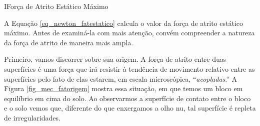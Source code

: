 













\begin{secnivel}{I}{Força de Atrito Estático Máximo}
  

\end{secnivel}








A Equação \eqref{eq_newton_fatestatico} calcula o valor da força de atrito estático máximo. Antes de examiná-la com mais atenção, convém compreender a natureza da força de atrito de maneira mais ampla.

Primeiro, vamos discorrer sobre sua origem. A força de atrito entre duas superfícies é uma força que irá resistir à tendência de movimento relativo entre as superfícies pelo fato de elas estarem, em escala microscópica, ``\textit{acopladas}.'' A Figura \ref{fig_mec_fatorigem} mostra essa situação, em que temos um bloco em equilíbrio em cima do solo. Ao observarmos a superfície de contato entre o bloco e o solo vemos que, diferente do que enxergamos a olho nu, tal superfície é repleta de irregularidades. 


